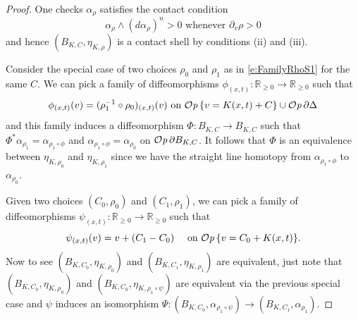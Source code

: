 \documentclass[12pt]{paper}
\theoremstyle{plain}
\theoremstyle{definition}
\newcommand{\p}{\partial}
\newcommand{\R}{{\mathbb{R}}}
\def\Op{{\mathcal O}{\it p}\,}
\numberwithin{figure}{section}
\begin{document}
\begin{proof}
	One checks $\alpha_\rho$ satisfies the contact condition
	\begin{equation}\label{e:CC}
	\mbox{$\alpha_\rho \wedge (d\alpha_\rho)^n > 0$ whenever $\p_v \rho > 0$}
	\end{equation}
	and hence $(B_{K,C}, \eta_{K,\rho})$ is a contact shell by conditions (ii) and (iii).

	Consider the special case of two choices $\rho_0$ and $\rho_1$
	as in \eqref{e:FamilyRhoS1} for the same $C$.  We can pick a family of diffeomorphisms
	$\phi_{(x,t)}: \R_{\geq 0} \to \R_{\geq 0}$ such that
	$$
		\phi_{(x,t)}(v) = (\rho_1^{-1}\circ\rho_0)_{(x,t)}(v) \mbox{ on }
		\Op \{v = K(x,t) + C\} \cup \Op \partial\Delta
	$$
	and this family induces a diffeomorphism $\Phi: B_{K,C} \to B_{K,C}$ such that
	$\Phi^*\alpha_{\rho_1} = \alpha_{\rho_1 \circ \phi}$ and $\alpha_{\rho_1 \circ \phi} = \alpha_{\rho_0}$
	on $\Op\partial B_{K,C}$.  It follows that $\Phi$ is an equivalence between $\eta_{K, \rho_0}$ and $\eta_{K, \rho_1}$
	since we have the straight line homotopy from $\alpha_{\rho_1 \circ \phi}$ to $\alpha_{\rho_0}$.
	
	
	Given two choices $(C_0, \rho_0)$ and $(C_1, \rho_1)$, we can 
	pick a  family of diffeomorphisms  $\psi_{(x,t)}: \R_{\geq 0} \to \R_{\geq 0}$
	such that
	$$
	\psi_{(x,t)}(v) = %
	 v + (C_1 - C_0) %
	 \quad \mbox{ on $\Op \{v = C_0+K(x,t)\}$}.
	 $$  
	 Now to see $(B_{K, C_0}, \eta_{K, \rho_0})$ and $(B_{K, C_1}, \eta_{K, \rho_1})$
	 are equivalent, just note that $(B_{K, C_0}, \eta_{K, \rho_0})$ and $(B_{K, C_0}, \eta_{K, \rho_1 \circ \psi})$ are 
	 equivalent via the previous special case and $\psi$ induces
	 an isomorphism $\Psi: (B_{K, C_0}, \alpha_{\rho_1\circ\psi}) \to (B_{K, C_1}, \alpha_{\rho_1})$.
\end{proof}
	
\end{document}

